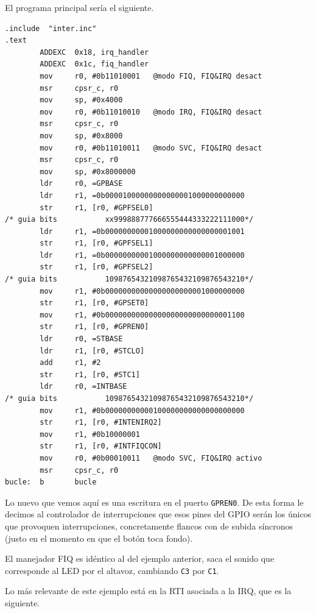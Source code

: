 El programa principal sería el siguiente.

\begin{lstlisting}[caption={Programa principal de inter6.s},label={lst:codigoPract5_6}]
        .include  "inter.inc"
.text
        ADDEXC  0x18, irq_handler
        ADDEXC  0x1c, fiq_handler
        mov     r0, #0b11010001   @modo FIQ, FIQ&IRQ desact
        msr     cpsr_c, r0
        mov     sp, #0x4000
        mov     r0, #0b11010010   @modo IRQ, FIQ&IRQ desact
        msr     cpsr_c, r0
        mov     sp, #0x8000
        mov     r0, #0b11010011   @modo SVC, FIQ&IRQ desact
        msr     cpsr_c, r0
        mov     sp, #0x8000000
        ldr     r0, =GPBASE
        ldr     r1, =0b00001000000000000001000000000000
        str     r1, [r0, #GPFSEL0]
/* guia bits           xx999888777666555444333222111000*/
        ldr     r1, =0b00000000001000000000000000001001
        str     r1, [r0, #GPFSEL1]
        ldr     r1, =0b00000000001000000000000001000000
        str     r1, [r0, #GPFSEL2]
/* guia bits           10987654321098765432109876543210*/
        mov     r1, #0b00000000000000000000001000000000
        str     r1, [r0, #GPSET0]
        mov     r1, #0b00000000000000000000000000001100
        str     r1, [r0, #GPREN0]
        ldr     r0, =STBASE
        ldr     r1, [r0, #STCLO]
        add     r1, #2
        str     r1, [r0, #STC1]
        ldr     r0, =INTBASE
/* guia bits           10987654321098765432109876543210*/
        mov     r1, #0b00000000000100000000000000000000
        str     r1, [r0, #INTENIRQ2]
        mov     r1, #0b10000001
        str     r1, [r0, #INTFIQCON]
        mov     r0, #0b00010011   @modo SVC, FIQ&IRQ activo
        msr     cpsr_c, r0
bucle:  b       bucle
\end{lstlisting}

Lo nuevo que vemos aquí es una escritura en el puerto {\tt GPREN0}. De esta forma
le decimos al controlador de interrupciones que esos pines del GPIO serán los únicos que
provoquen interrupciones, concretamente flancos con de subida síncronos (justo
en el momento en que el botón toca fondo).

El manejador FIQ es idéntico al del ejemplo anterior, saca el sonido que corresponde al LED
por el altavoz, cambiando {\tt C3} por {\tt C1}.

Lo más relevante de este ejemplo está en la RTI asociada a la IRQ, que es la siguiente.

